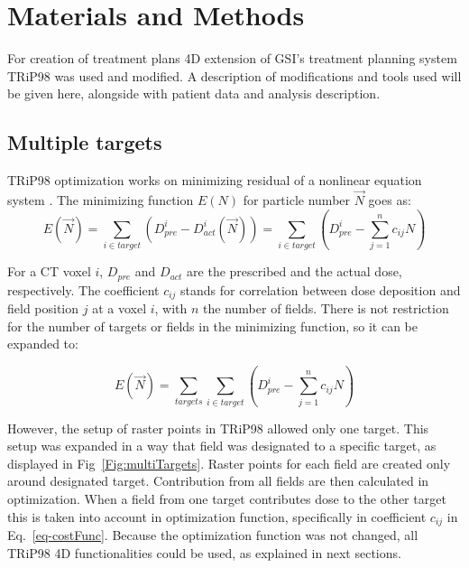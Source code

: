 \documentclass[type=dr, dr=rernat, accentcolor=tud7b,colorbacktitle, bigchapter, openright, twoside, 12pt ]{tudthesis}
\begin{document}

\section{Materials and Methods}

For creation of treatment plans 4D extension of GSI's treatment planning system TRiP98 \cite{Kraemer2000a, Richter2013} was used and modified. A description of modifications and tools used will be given here, 
alongside with patient data and analysis description.

\subsection{Multiple targets}

TRiP98 optimization works on minimizing residual of a nonlinear equation system \cite{Kraemer2000a}. The minimizing function $E(N)$ for particle number $\vec{N}$ goes as:
\begin{equation}
\label{eq-costFunc}
 E(\vec{N}) = \sum_{i\in target} \left( D_{pre}^{i} - D_{act}^{i}(\vec{N})\right) = \sum_{i\in target} \left( D_{pre}^{i} -\sum_{j=1}^n c_{ij}N\right)
\end{equation}

For a CT voxel $i$, $ D_{pre}$ and $D_{act}$ are the prescribed and the actual dose, respectively. The coefficient $c_{ij}$ stands for correlation between dose deposition and field position $j$ at a voxel $i$, with $n$ the number of fields. There is not restriction for the number of targets or fields in the minimizing function, so it can be expanded to:

\begin{equation}
\label{eq-multiCost}
 E(\vec{N}) = \sum_{targets} \sum_{i\in target} \left( D_{pre}^{i} -\sum_{j=1}^n c_{ij}N\right)
\end{equation}

However, the setup of raster points in TRiP98 allowed only one target. This setup was expanded in a way that field was designated to a specific target, as displayed in Fig~\ref{Fig:multiTargets}. 
Raster points for each field are created only around designated target. Contribution from all fields are then calculated in optimization. When a field from one target contributes 
dose to the other target this is taken into account in optimization function, specifically in coefficient $c_{ij}$ in Eq.~\ref{eq-costFunc}. Because the optimization function was not changed, 
all TRiP98 4D functionalities could be used, as explained in next sections.
\end{document}
